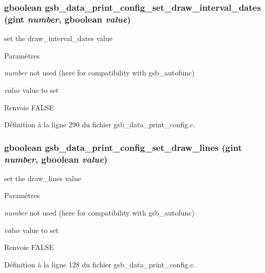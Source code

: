 \subsubsection[{gsb\_\-data\_\-print\_\-config\_\-set\_\-draw\_\-interval\_\-dates}]{\setlength{\rightskip}{0pt plus 5cm}gboolean gsb\_\-data\_\-print\_\-config\_\-set\_\-draw\_\-interval\_\-dates (gint {\em number}, \/  gboolean {\em value})}\label{gsb__data__print__config_8h_a672a308b8bc95de4e737f7abd610d0b1}
set the draw\_\-interval\_\-dates value


\begin{DoxyParams}{Paramètres}
\item[{\em number}]not used (here for compatibility with gsb\_\-autofunc) \item[{\em value}]value to set\end{DoxyParams}
\begin{DoxyReturn}{Renvoie}
FALSE 
\end{DoxyReturn}


Définition à la ligne 290 du fichier gsb\_\-data\_\-print\_\-config.c.

\subsubsection[{gsb\_\-data\_\-print\_\-config\_\-set\_\-draw\_\-lines}]{\setlength{\rightskip}{0pt plus 5cm}gboolean gsb\_\-data\_\-print\_\-config\_\-set\_\-draw\_\-lines (gint {\em number}, \/  gboolean {\em value})}\label{gsb__data__print__config_8h_acbb938f35f95f8ab78bb62f266ea3143}
set the draw\_\-lines value


\begin{DoxyParams}{Paramètres}
\item[{\em number}]not used (here for compatibility with gsb\_\-autofunc) \item[{\em value}]value to set\end{DoxyParams}
\begin{DoxyReturn}{Renvoie}
FALSE 
\end{DoxyReturn}


Définition à la ligne 128 du fichier gsb\_\-data\_\-print\_\-config.c.


